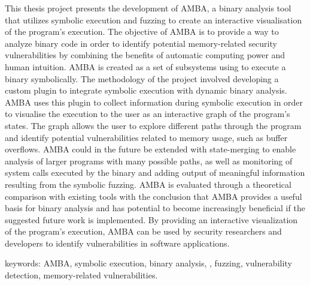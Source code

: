 
This thesis project presents the development of AMBA, a binary analysis
tool that utilizes symbolic execution and fuzzing to create an interactive
visualisation of the program's execution. The objective of AMBA is to provide
a way to analyze binary code in order to identify potential memory-related security
vulnerabilities by combining the benefits of automatic computing power and
human intuition. AMBA is created as a set of subsystems using \stoe{} to
execute a binary symbolically. The methodology of the project involved
developing a custom \stoe{} plugin to integrate symbolic execution with
dynamic binary analysis. AMBA uses this plugin to collect information during
symbolic execution in order to visualise the execution to the user as an
interactive graph of the program's states. The graph allows the user to explore 
different paths through the program and identify potential vulnerabilities 
related to memory usage, such as buffer overflows. AMBA could in the future  
be extended with state-merging to enable analysis of larger programs with 
many possible paths, as well as monitoring of system calls executed by the binary and 
adding output of meaningful information resulting from the symbolic fuzzing. AMBA 
is evaluated through a theoretical comparison with existing tools with the conclusion   
that AMBA provides a useful basis for binary analysis and has potential to become 
increasingly beneficial if the suggested future work is implemented. By providing 
an interactive visualization of the program's execution, AMBA can be used by security 
researchers and developers to identify vulnerabilities in software applications.


keywords: AMBA, symbolic execution, binary analysis, \stoe{},
fuzzing, vulnerability detection, memory-related vulnerabilities.
